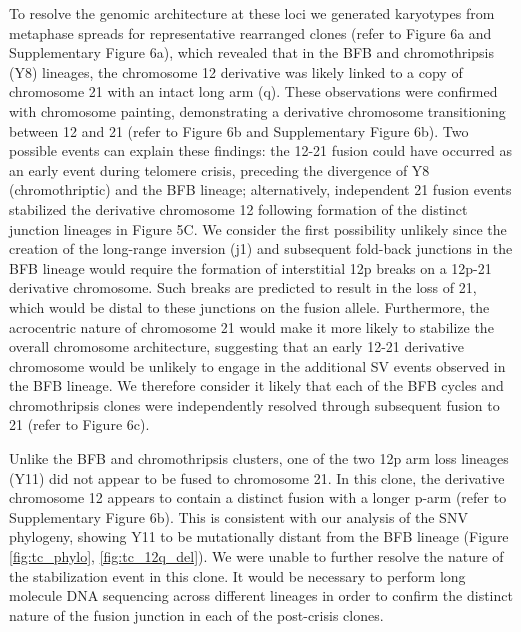 \documentclass[phd,tocprelim]{cornell}
\begin{document}
To resolve the genomic architecture at these loci we generated karyotypes from metaphase spreads for representative rearranged clones (refer to \cite{Dewhurst2021-jk} Figure 6a and Supplementary Figure 6a), which revealed that in the BFB and chromothripsis (Y8) lineages, the chromosome 12 derivative was likely linked to a copy of chromosome 21 with an intact long arm (q). These observations were confirmed with chromosome painting, demonstrating a derivative chromosome transitioning between 12 and 21 (refer to \cite{Dewhurst2021-jk} Figure 6b and Supplementary Figure 6b). Two possible events can explain these findings: the 12-21 fusion could have occurred as an early event during telomere crisis, preceding the divergence of Y8 (chromothriptic) and the BFB lineage; alternatively, independent 21 fusion events stabilized the derivative chromosome 12 following formation of the distinct junction lineages in Figure 5C. We consider the first possibility unlikely since the creation of the long-range inversion (j1) and subsequent fold-back junctions in the BFB lineage would require the formation of interstitial 12p breaks on a 12p-21 derivative chromosome. Such breaks are predicted to result in the loss of 21, which would be distal to these junctions on the fusion allele. Furthermore, the acrocentric nature of chromosome 21 would make it more likely to stabilize the overall chromosome architecture, suggesting that an early 12-21 derivative chromosome would be unlikely to engage in the additional SV events observed in the BFB lineage. We therefore consider it likely that each of the BFB cycles and chromothripsis clones were independently resolved through subsequent fusion to 21 (refer to \cite{Dewhurst2021-jk} Figure 6c).

Unlike the BFB and chromothripsis clusters, one of the two 12p arm loss lineages (Y11) did not appear to be fused to chromosome 21. In this clone, the derivative chromosome 12 appears to contain a distinct fusion with a longer p-arm (refer to \cite{Dewhurst2021-jk}Supplementary Figure 6b). This is consistent with our analysis of the SNV phylogeny, showing Y11 to be mutationally distant from the BFB lineage (Figure \ref{fig:tc_phylo}, \ref{fig:tc_12q_del}).  We were unable to further resolve the nature of the stabilization event in this clone. It would be necessary to perform long molecule DNA sequencing across different lineages in order to confirm the distinct nature of the fusion junction in each of the post-crisis clones.
\end{document}
